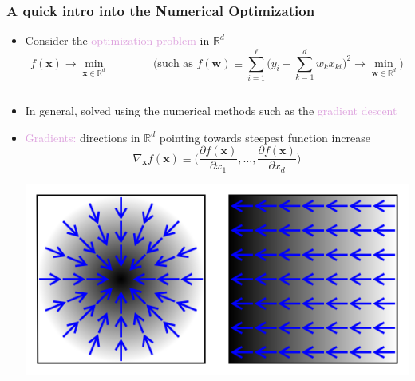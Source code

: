 \documentclass[usenames,dvipsnames,aspectratio=169]{beamer}
\begin{document}
\begin{frame}
\frametitle{A quick intro into the Numerical Optimization}

\begin{itemize}

\item Consider the \textcolor{Plum}{optimization problem}
in $\mathbb{R}^d$
\vspace{-5mm}
\[
f(\mathbf{x}) \to \min_{\mathbf{x} \in \mathbb{R}^d}
\qquad \qquad 
\mbox{(such as }
f(\mathbf{w}) \equiv 
\sum\limits_{i=1}^{\ell} 
  \Big(y_i - \sum\limits_{k=1}^d w_k x_{ki}\Big)^2
  \to \min\limits_{\mathbf{w} \in \mathbb{R}^d}\mbox{)}
\]
\end{itemize}

\pause
\vspace{-5mm}
\begin{columns}
\begin{column}{0.5\textwidth}
\begin{itemize}

\item In general, solved using the numerical methods
such as the \textcolor{Plum}{gradient descent}

\item \textcolor{Plum}{Gradients:} directions in $\mathbb{R}^d$
pointing towards steepest function increase
\[
\nabla_{\mathbf{x}} f(\mathbf{x}) \equiv 
\Big(
\frac{\partial f(\mathbf{x})}{\partial x_1},
\ldots,
\frac{\partial f(\mathbf{x})}{\partial x_d}
\Big)
\]

\begin{center}
\includegraphics[width=0.5\columnwidth]{gradient_example.png}
\end{center}
\end{itemize}


\end{column}
\end{columns}
\end{frame}
\end{document}
